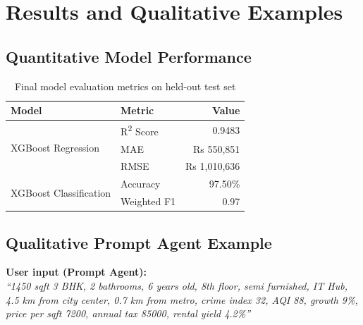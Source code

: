 \documentclass[12pt,a4paper]{article}
\begin{document}
\section{Results and Qualitative Examples}

\subsection{Quantitative Model Performance}

\begin{table}[H]
\centering
\caption{Final model evaluation metrics on held-out test set}
\begin{tabular}{llr}
\toprule
\textbf{Model} & \textbf{Metric} & \textbf{Value} \\
\midrule
\multirow{3}{*}{XGBoost Regression}
  & R\textsuperscript{2} Score & 0.9483 \\
  & MAE                        & Rs 550,851 \\
  & RMSE                       & Rs 1,010,636 \\
\midrule
\multirow{2}{*}{XGBoost Classification}
  & Accuracy    & 97.50\% \\
  & Weighted F1 & 0.97 \\
\bottomrule
\end{tabular}
\end{table}

\subsection{Qualitative Prompt Agent Example}

\begin{infobox}
\textbf{User input (Prompt Agent):}\\
\textit{``1450 sqft 3 BHK, 2 bathrooms, 6 years old, 8th floor, semi furnished, IT Hub, 4.5 km from city center, 0.7 km from metro, crime index 32, AQI 88, growth 9\%, price per sqft 7200, annual tax 85000, rental yield 4.2\%''}
\end{infobox}

\vspace{0.5em}
\end{document}
